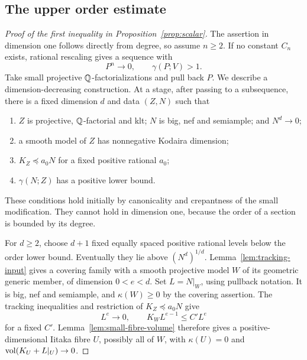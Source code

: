 \subsection{The upper order estimate}

\begin{proof}[Proof of the first inequality in Proposition~\ref{prop:scalar}]
The assertion in dimension one follows directly from degree, so
assume $n\ge2$.  If no constant $C_n$ exists, rational rescaling
gives a sequence with
\[
                           P^n\longrightarrow0,
                           \qquad\gamma(P;V)>1.
\]
Take small projective $\mathbb Q$-factorializations and pull back $P$.
We describe a dimension-decreasing construction.  At a stage, after
passing to a subsequence, there is a fixed dimension $d$ and data
$(Z,N)$ such that
\begin{enumerate}
\item $Z$ is projective, $\mathbb Q$-factorial and klt; $N$ is big, nef
and semiample; and $N^d\to0$;
\item a smooth model of $Z$ has nonnegative Kodaira dimension;
\item $K_Z\preceq a_0N$ for a fixed positive rational $a_0$;
\item $\gamma(N;Z)$ has a positive lower bound.
\end{enumerate}
These conditions hold initially by canonicality and crepantness
of the small modification.  They cannot hold in dimension one,
because the order of a section is bounded by its degree.

For $d\ge2$, choose $d+1$ fixed equally spaced positive rational
levels below the order lower bound.  Eventually they lie above
$(N^d)^{1/d}$.  Lemma~\ref{lem:tracking-input} gives a covering
family with a smooth projective model $W$ of its geometric generic
member, of dimension $0<e<d$.  Set $L=N|_W$, using pullback notation.
It is big, nef and semiample, and $\kappa(W)\ge0$ by the
covering assertion.  The tracking inequalities and restriction of
$K_Z\preceq a_0N$ give
\[
                         L^e\longrightarrow0,
                         \qquad K_WL^{e-1}\le C'L^e
\]
for a fixed $C'$.  Lemma~\ref{lem:small-fibre-volume} therefore
gives a positive-dimensional Iitaka fibre $U$, possibly all of
$W$, with $\kappa(U)=0$ and
$\operatorname{vol}(K_U+L|_U)\to0$.


\end{proof}
